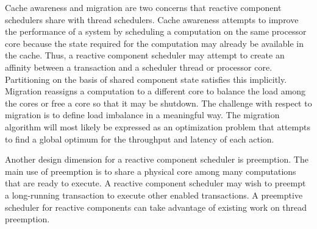 Cache awareness and migration are two concerns that reactive component schedulers share with thread schedulers.
Cache awareness attempts to improve the performance of a system by scheduling a computation on the same processor core because the state required for the computation may already be available in the cache.
Thus, a reactive component scheduler may attempt to create an affinity between a transaction and a scheduler thread or processor core.
Partitioning on the basis of shared component state satisfies this implicitly.
Migration reassigns a computation to a different core to balance the load among the cores or free a core so that it may be shutdown.
The challenge with respect to migration is to define load imbalance in a meaningful way.
The migration algorithm will most likely be expressed as an optimization problem that attempts to find a global optimum for the throughput and latency of each action.

Another design dimension for a reactive component scheduler is preemption.
The main use of preemption is to share a physical core among many computations that are ready to execute.
A reactive component scheduler may wish to preempt a long-running transaction to execute other enabled transactions.
A preemptive scheduler for reactive components can take advantage of existing work on thread preemption.




